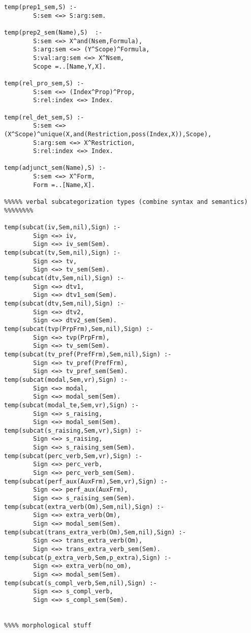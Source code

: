 \begin{verbatim}
temp(prep1_sem,S) :-
        S:sem <=> S:arg:sem.
        
temp(prep2_sem(Name),S)  :-
        S:sem <=> X^and(Nsem,Formula),
        S:arg:sem <=> (Y^Scope)^Formula,
        S:val:arg:sem <=> X^Nsem,
        Scope =..[Name,Y,X].
        
temp(rel_pro_sem,S) :-
        S:sem <=> (Index^Prop)^Prop,
        S:rel:index <=> Index.  
                
temp(rel_det_sem,S) :-
        S:sem <=> (X^Scope)^unique(X,and(Restriction,poss(Index,X)),Scope),
        S:arg:sem <=> X^Restriction,    
        S:rel:index <=> Index.
        
temp(adjunct_sem(Name),S) :-
        S:sem <=> X^Form,
        Form =..[Name,X].
        
%%%%% verbal subcategorization types (combine syntax and semantics) %%%%%%%%

temp(subcat(iv,Sem,nil),Sign) :-
        Sign <=> iv,
        Sign <=> iv_sem(Sem).
temp(subcat(tv,Sem,nil),Sign) :-
        Sign <=> tv,
        Sign <=> tv_sem(Sem).
temp(subcat(dtv,Sem,nil),Sign) :-
        Sign <=> dtv1,
        Sign <=> dtv1_sem(Sem).
temp(subcat(dtv,Sem,nil),Sign) :-
        Sign <=> dtv2,
        Sign <=> dtv2_sem(Sem).
temp(subcat(tvp(PrpFrm),Sem,nil),Sign) :-
        Sign <=> tvp(PrpFrm),
        Sign <=> tv_sem(Sem).
temp(subcat(tv_pref(PrefFrm),Sem,nil),Sign) :-
        Sign <=> tv_pref(PrefFrm),
        Sign <=> tv_pref_sem(Sem).
temp(subcat(modal,Sem,vr),Sign) :-
        Sign <=> modal,
        Sign <=> modal_sem(Sem).
temp(subcat(modal_te,Sem,vr),Sign) :-
        Sign <=> s_raising,
        Sign <=> modal_sem(Sem).
temp(subcat(s_raising,Sem,vr),Sign) :-
        Sign <=> s_raising,
        Sign <=> s_raising_sem(Sem).
temp(subcat(perc_verb,Sem,vr),Sign) :-
        Sign <=> perc_verb,
        Sign <=> perc_verb_sem(Sem).
temp(subcat(perf_aux(AuxFrm),Sem,vr),Sign) :-
        Sign <=> perf_aux(AuxFrm),
        Sign <=> s_raising_sem(Sem).
temp(subcat(extra_verb(Om),Sem,nil),Sign) :-
        Sign <=> extra_verb(Om),
        Sign <=> modal_sem(Sem).
temp(subcat(trans_extra_verb(Om),Sem,nil),Sign) :-
        Sign <=> trans_extra_verb(Om),
        Sign <=> trans_extra_verb_sem(Sem).
temp(subcat(p_extra_verb,Sem,p_extra),Sign) :-
        Sign <=> extra_verb(no_om),
        Sign <=> modal_sem(Sem).        
temp(subcat(s_compl_verb,Sem,nil),Sign) :-
        Sign <=> s_compl_verb,
        Sign <=> s_compl_sem(Sem).
        
        
%%%% morphological stuff


\end{verbatim}

